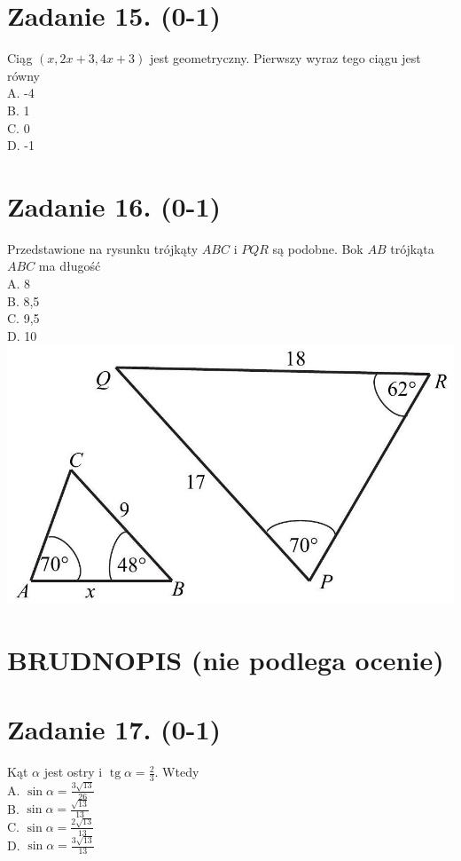 \documentclass[10pt]{article}
\begin{document}
\section*{Zadanie 15. (0-1)}
Ciąg \((x, 2 x+3,4 x+3)\) jest geometryczny. Pierwszy wyraz tego ciągu jest równy\\
A. -4\\
B. 1\\
C. 0\\
D. -1

\section*{Zadanie 16. (0-1)}
Przedstawione na rysunku trójkąty \(A B C\) i \(P Q R\) są podobne. Bok \(A B\) trójkąta \(A B C\) ma długość\\
A. 8\\
B. 8,5\\
C. 9,5\\
D. 10\\
\includegraphics[max width=\textwidth, center]{2024_11_21_1c92fcc0db78c9202015g-06(1)}

\section*{BRUDNOPIS (nie podlega ocenie)}
\section*{Zadanie 17. (0-1)}
Kąt \(\alpha\) jest ostry i \(\operatorname{tg} \alpha=\frac{2}{3}\). Wtedy\\
A. \(\sin \alpha=\frac{3 \sqrt{13}}{26}\)\\
B. \(\sin \alpha=\frac{\sqrt{13}}{13}\)\\
C. \(\sin \alpha=\frac{2 \sqrt{13}}{13}\)\\
D. \(\sin \alpha=\frac{3 \sqrt{13}}{13}\)
\end{document}
